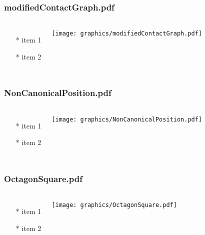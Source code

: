 \begin{frame} \frametitle{modifiedContactGraph.pdf}
    \begin{columns}[c]
        \begin{itemize}
            \item[*] item 1
            \item[*] item 2
        \end{itemize}
        \begin{minipage}{\linewidth}
            \begin{center}
            \texttt{[image: graphics/modifiedContactGraph.pdf]}
            \label{gfx:modifiedContactGraph.pdf}
            \end{center}
        \end{minipage}
    \end{columns}
\end{frame}
\begin{frame} \frametitle{NonCanonicalPosition.pdf}
    \begin{columns}[c]
        \begin{itemize}
            \item[*] item 1
            \item[*] item 2
        \end{itemize}
        \begin{minipage}{\linewidth}
            \begin{center}
            \texttt{[image: graphics/NonCanonicalPosition.pdf]}
            \label{gfx:NonCanonicalPosition.pdf}
            \end{center}
        \end{minipage}
    \end{columns}
\end{frame}
\begin{frame} \frametitle{OctagonSquare.pdf}
    \begin{columns}[c]
        \begin{itemize}
            \item[*] item 1
            \item[*] item 2
        \end{itemize}
        \begin{minipage}{\linewidth}
            \begin{center}
            \texttt{[image: graphics/OctagonSquare.pdf]}
            \label{gfx:OctagonSquare.pdf}
            \end{center}
        \end{minipage}
    \end{columns}
\end{frame}
